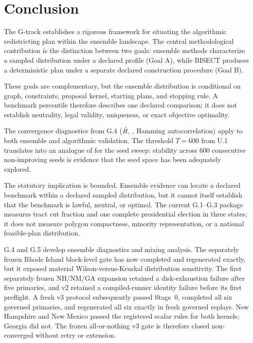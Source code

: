 \section{Conclusion}
\label{sec:conclusion}

The G-track establishes a rigorous framework for situating the \ar{}
algorithmic redistricting plan within the ensemble landscape.  The central
methodological contribution is the distinction between two goals: ensemble
methods characterize a sampled distribution under a declared profile (Goal
A), while BISECT produces a deterministic plan under a separate declared
construction procedure (Goal B).

These goals are complementary, but the ensemble distribution is conditional
on graph, constraints, proposal kernel, starting plans, and stopping rule. A
benchmark percentile therefore describes one declared comparison; it does not
establish neutrality, legal validity, uniqueness, or exact objective
optimality.

The convergence diagnostics from G.4 ($\hat{R}$, \ess{}, Hamming autocorrelation)
apply to both ensemble and algorithmic validation.  The \cs{} threshold
$T = 600$ from U.1 translates into an analogue of \ess{} for the seed
sweep: stability across 600 consecutive non-improving seeds is evidence that
the seed space has been adequately explored.

The statutory implication is bounded. Ensemble evidence can locate a declared
benchmark within a declared sampled distribution, but it cannot itself
establish that the benchmark is lawful, neutral, or optimal. The current
G.1--G.3 package measures tract cut fraction and one complete presidential
election in three states; it does not measure polygon compactness, minority
representation, or a national feasible-plan distribution.

G.4 and G.5 develop ensemble diagnostics and mixing analysis. The separately
frozen Rhode Island block-level gate has now completed and regenerated exactly,
but it exposed material Wilson-versus-Kruskal distribution sensitivity.  The
first separately frozen NH/NM/GA expansion retained a disk-exhaustion failure
after five primaries, and v2 retained a compiled-runner identity failure before
its first preflight.  A fresh v3 protocol subsequently passed Stage~0,
completed all six governed primaries, and regenerated all six exactly in fresh
governed replays.  New Hampshire and New Mexico passed the registered scalar
rules for both kernels; Georgia did not.  The frozen all-or-nothing v3 gate is
therefore closed non-converged without retry or extension.

